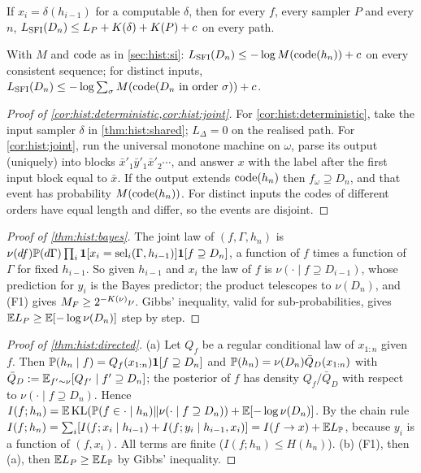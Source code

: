\begin{corollary}\label{cor:hist:deterministic}
If $x_i=\delta(h_{i-1})$ for a computable $\delta$, then for every $f$, every sampler $P$ and every $n$, $L_{\mathrm{SFI}}(D_n)\le L_P+K(\delta)+K(P)+c$ on every path.
\end{corollary}

\begin{corollary}\label{cor:hist:joint}
With $M$ and $\operatorname{code}$ as in \cref{sec:hist:si}: $L_{\mathrm{SFI}}(D_n)\le-\log M(\operatorname{code}(h_n))+c$ on every consistent sequence; for distinct inputs, $L_{\mathrm{SFI}}(D_n)\le-\log\sum_\sigma M(\operatorname{code}(D_n\text{ in order }\sigma))+c$.
\end{corollary}

\begin{proof}[Proof of \cref{cor:hist:deterministic,cor:hist:joint}]
For \cref{cor:hist:deterministic}, take the input sampler $\delta$ in \cref{thm:hist:shared}; $L_\Delta=0$ on the realised path. For \cref{cor:hist:joint}, run the universal monotone machine on $\omega$, parse its output (uniquely) into blocks $\bar x'_1\bar y'_1\bar x'_2\cdots$, and answer $x$ with the label after the first input block equal to $\bar x$. If the output extends $\operatorname{code}(h_n)$ then $f_\omega\supseteq D_n$, and that event has probability $M(\operatorname{code}(h_n))$. For distinct inputs the codes of different orders have equal length and differ, so the events are disjoint.
\end{proof}

\begin{proof}[Proof of \cref{thm:hist:bayes}]
The joint law of $(f,\Gamma,h_n)$ is $\nu(df)\mathbb{P}(d\Gamma)\prod_i\mathbf{1}[x_i=\mathrm{sel}_i(\Gamma,h_{i-1})]\mathbf{1}[f\supseteq D_n]$, a function of $f$ times a function of $\Gamma$ for fixed $h_{i-1}$. So given $h_{i-1}$ and $x_i$ the law of $f$ is $\nu(\cdot\mid f\supseteq D_{i-1})$, whose prediction for $y_i$ is the Bayes predictor; the product telescopes to $\nu(D_n)$, and (F1) gives $M_{F}\ge2^{-K(\nu)}\nu$. Gibbs' inequality, valid for sub-probabilities, gives $\mathbb{E} L_P\ge\mathbb{E}[-\log\nu(D_n)]$ step by step.
\end{proof}

\begin{proof}[Proof of \cref{thm:hist:directed}]
(a) Let $Q_f$ be a regular conditional law of $x_{1:n}$ given $f$. Then $\mathbb{P}(h_n\mid f)=Q_f(x_{1:n})\mathbf{1}[f\supseteq D_n]$ and $\mathbb{P}(h_n)=\nu(D_n)\bar Q_D(x_{1:n})$ with $\bar Q_D:=\mathbb{E}_{f'\sim\nu}[Q_{f'}\mid f'\supseteq D_n]$; the posterior of $f$ has density $Q_f/\bar Q_D$ with respect to $\nu(\cdot\mid f\supseteq D_n)$. Hence $I(f;h_n)=\mathbb{E}\operatorname{KL}(\mathbb{P}(f\in\cdot\mid h_n)\Vert\nu(\cdot\mid f\supseteq D_n))+\mathbb{E}[-\log\nu(D_n)]$. By the chain rule $I(f;h_n)=\sum_i[I(f;x_i\mid h_{i-1})+I(f;y_i\mid h_{i-1},x_i)]=I(f\to x)+\mathbb{E} L_{\mathbb{P}}$, because $y_i$ is a function of $(f,x_i)$. All terms are finite ($I(f;h_n)\le H(h_n)$). (b) (F1), then (a), then $\mathbb{E} L_P\ge\mathbb{E} L_{\mathbb{P}}$ by Gibbs' inequality.
\end{proof}

